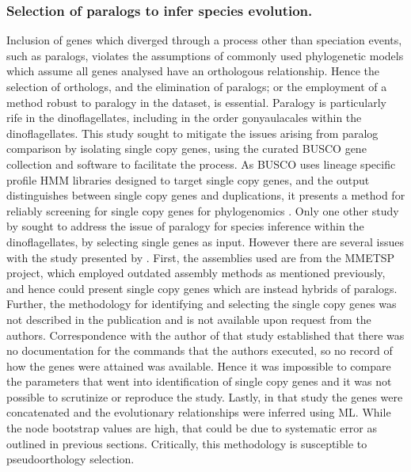 \documentclass[fleqn,10pt,lineno]{wlpeerj} %
\begin{document}
\subsubsection*{Selection of paralogs to infer species evolution.}
Inclusion of genes which diverged through a process other than speciation events, such as paralogs, violates the assumptions of commonly used phylogenetic models which assume all genes analysed have an orthologous relationship.
Hence the selection of orthologs, and the elimination of paralogs; or the employment of a method robust to paralogy in the dataset, is essential.
Paralogy is particularly rife in the dinoflagellates, including in the order gonyaulacales within the dinoflagellates. 
This study sought to mitigate the issues arising from paralog comparison by isolating single copy genes, using the curated BUSCO gene collection and software to facilitate the process. 
As BUSCO uses lineage specific profile HMM libraries designed to target single copy genes, and the output distinguishes between single copy genes and duplications, it presents a method for reliably screening for single copy genes for phylogenomics \citep{waterhouse2017busco}.
Only one other study by \cite{price2017robust} sought to address the issue of paralogy for species inference within the dinoflagellates, by selecting single genes as input. 
However there are several issues with the study presented by \cite{price2017robust}. 
First, the assemblies used are from the MMETSP project, which employed outdated assembly methods as mentioned previously, and hence could present single copy genes which are instead hybrids of paralogs. 
Further, the methodology for identifying and selecting the single copy genes was not described in the publication and is not available upon request from the authors. 
Correspondence with the author of that study established that there was no documentation for the commands that the authors executed, so no record of how the genes were attained was available. 
Hence it was impossible to compare the parameters that went into identification of single copy genes and it was not possible to scrutinize or reproduce the study.
Lastly, in that study the genes were concatenated and the evolutionary relationships were inferred using ML. 
While the node bootstrap values are high, that could be due to systematic error as outlined in previous sections.
Critically, this methodology is susceptible to pseudoorthology selection.
\end{document}

